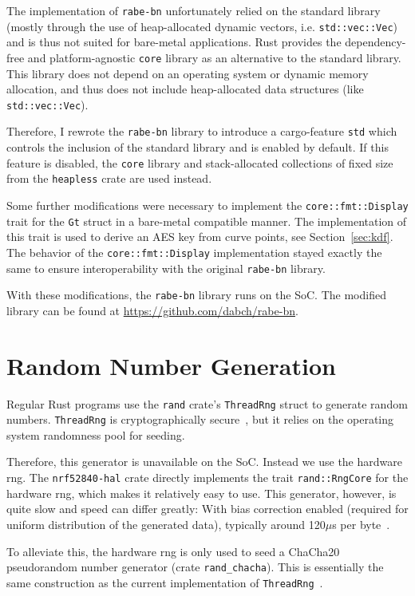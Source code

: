 The implementation of \texttt{rabe-bn} unfortunately relied on the standard library (mostly through the use of heap-allocated dynamic vectors, i.e. \texttt{std::vec::Vec}) and is thus not suited for bare-metal applications.
Rust provides the dependency-free and platform-agnostic \texttt{core} library as an alternative to the standard library.
This library does not depend on an operating system or dynamic memory allocation, and thus does not include heap-allocated data structures (like \texttt{std::vec::Vec}).

Therefore, I rewrote the \texttt{rabe-bn} library to introduce a cargo-feature \texttt{std} which controls the inclusion of the standard library and is enabled by default.
If this feature is disabled, the \texttt{core} library and stack-allocated collections of fixed size from the \texttt{heapless} crate are used instead.

Some further modifications were necessary to implement the \texttt{core::fmt::Display} trait for the \texttt{Gt} struct in a bare-metal compatible manner.
The implementation of this trait is used to derive an AES key from curve points, see Section~\ref{sec:kdf}.
The behavior of the \texttt{core::fmt::Display} implementation stayed exactly the same to ensure interoperability with the original \texttt{rabe-bn} library.

With these modifications, the \texttt{rabe-bn} library runs on the SoC.
The modified library can be found at \url{https://github.com/dabch/rabe-bn}.

\section{Random Number Generation}
Regular Rust programs use the \texttt{rand} \gls{crate}'s \verb+ThreadRng+ struct to generate random numbers.
\texttt{ThreadRng} is cryptographically secure~\cite{noauthor_rust_nodate}, but it relies on the operating system randomness pool for seeding.

Therefore, this generator is unavailable on the SoC.
Instead we use the hardware \acrshort{rng}.
The \texttt{nrf52840-hal} crate directly implements the trait \texttt{rand::RngCore} for the hardware \acrshort{rng}, which makes it relatively easy to use.
This generator, however, is quite slow and speed can differ greatly: With bias correction enabled (required for uniform distribution of the generated data), typically around 120$\mu$s per byte~\cite{noauthor_nrf52840_nodate}.

To alleviate this, the hardware \acrshort{rng} is only used to seed a ChaCha20 pseudorandom number generator (crate \texttt{rand\_chacha}).
This is essentially the same construction as the current implementation of \texttt{ThreadRng}~\cite{noauthor_rust_nodate}.

